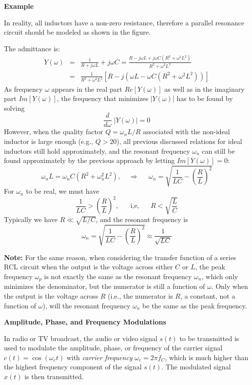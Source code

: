 {\bf Example} 

In reality, all inductors have a non-zero resistance, therefore a 
parallel resonance circuit should be modeled as shown in the figure.


The admittance is:
\begin{eqnarray}
  Y(\omega)&=&\frac{1}{R+j\omega L}+j\omega C
  =\frac{R-j\omega L+j\omega C(R^2+\omega^2L^2)}{R^2+\omega^2L^2}
  \nonumber \\
  &=&\frac{1}{R^2+\omega^2L^2}[R-j(\omega L-\omega C(R^2+\omega^2L^2))]
  \nonumber
\end{eqnarray}
As frequency $\omega$ appears in the real part $Re[Y(\omega)]$ as well 
as in the imaginary part $Im[Y(\omega)]$, the frequency that minimizes 
$|Y(\omega)|$ has to be found by solving
\[
\frac{d}{d\omega} \; |Y(\omega)| =0 	
\]
However, when the quality factor $Q=\omega_n L/R$ associated with the
non-ideal inductor is large enough (e.g., $Q > 20$), all previous discussed 
relations for ideal inductors still hold approximately, and the resonant 
frequency $\omega_n$ can still be found approximately by the previous 
approach by letting $Im[Y(\omega)]=0$: 
\[	\omega_n L=\omega_n C(R^2+\omega_n^2L^2),\;\;\;\;\Longrightarrow
	\;\;\;\;\;\omega_n=\sqrt{\frac{1}{LC}-\left(\frac{R}{L}\right)^2}	\]
For $\omega_n$ to be real, we must have
\[	\frac{1}{LC} > (\frac{R}{L})^2, \;\;\;\;\;\;\mbox{i,e,}
	\;\;\;\;\;\;R<\sqrt{\frac{L}{C}}	\]
Typically we have $R \ll \sqrt{L/C}$, and the resonant frequency is
\[
\omega_n=\sqrt{\frac{1}{LC}-\left(\frac{R}{L}\right)^2}\approx \frac{1}{\sqrt{LC}}
\]

{\bf Note: } For the same reason, when considering the transfer function
of a series RCL circuit when the output is the voltage across either $C$
or $L$, the peak frequency $\omega_p$ is not exactly the same as the 
resonant frequency $\omega_n$, which only minimizes the denominator, but
the numerator is still a function of $\omega$. Only when the output is 
the voltage across $R$ (i.e., the numerator is $R$, a constant, not a 
function of $\omega$), will the resonant frequency $\omega_n$ be the same 
as the peak frequency.


{\bf Amplitude, Phase, and Frequency Modulations}

In radio or TV broadcast, the audio or video signal $s(t)$ to be transmitted 
is used to modulate the amplitude, phase, or frequency of the carrier signal 
$c(t)=\cos(\omega_c t)$ with {\em carrier frequency} $\omega_c=2\pi f_C$, which
is much higher than the highest frequency component of the signal $s(t)$. The 
modulated signal $x(t)$ is then transmitted.

